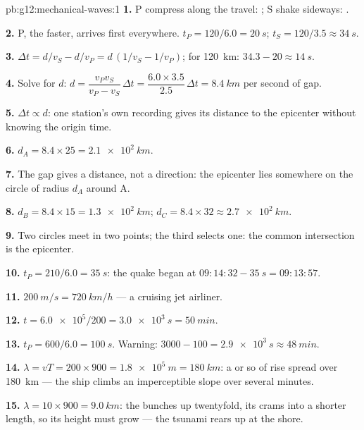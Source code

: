 \begin{solution}{pb:g12:mechanical-waves:1}
\textbf{1.} P compress along the travel: ; S shake
sideways: .

\textbf{2.} P, the faster, arrives first everywhere.
$t_P = 120/6.0 = \qty{20}{s}$; $t_S = 120/3.5 \approx \qty{34}{s}$.

\textbf{3.} $\Delta t = d/v_S - d/v_P = d\,(1/v_S - 1/v_P)$; for
\qty{120}{km}: $34.3 - 20 \approx \qty{14}{s}$.

\textbf{4.} Solve for $d$: $d = \dfrac{v_P v_S}{v_P - v_S}\,\Delta t
= \dfrac{6.0 \times 3.5}{2.5}\,\Delta t = \qty{8.4}{km}$ per second
of gap.

\textbf{5.} $\Delta t \propto d$: one station's own recording gives
its distance to the epicenter without knowing the origin time.

\textbf{6.} $d_A = 8.4 \times 25 = \qty{2.1e2}{km}$.

\textbf{7.} The gap gives a distance, not a direction: the epicenter
lies somewhere on the circle of radius $d_A$ around A.

\textbf{8.} $d_B = 8.4 \times 15 = \qty{1.3e2}{km}$;
$d_C = 8.4 \times 32 \approx \qty{2.7e2}{km}$.

\textbf{9.} Two circles meet in two points; the third selects one:
the common intersection is the epicenter.

\textbf{10.} $t_P = 210/6.0 = \qty{35}{s}$: the quake began at
$09{:}14{:}32 - \qty{35}{s} = 09{:}13{:}57$.

\textbf{11.} $\qty{200}{m/s} = \qty{720}{km/h}$ --- a cruising jet
airliner.

\textbf{12.} $t = \num{6.0e5}/200 = \qty{3.0e3}{s} = \qty{50}{min}$.

\textbf{13.} $t_P = 600/6.0 = \qty{100}{s}$. Warning:
$3000 - 100 = \qty{2.9e3}{s} \approx \qty{48}{min}$.

\textbf{14.} $\lambda = vT = 200 \times 900 = \qty{1.8e5}{m} =
\qty{180}{km}$: a  or so of rise spread over \qty{180}{km} ---
the ship climbs an imperceptible slope over several minutes.

\textbf{15.} $\lambda = 10 \times 900 = \qty{9.0}{km}$: the 
bunches up twentyfold, its  crams into a shorter length, so its
height must grow --- the tsunami rears up at the shore.


\end{solution}
